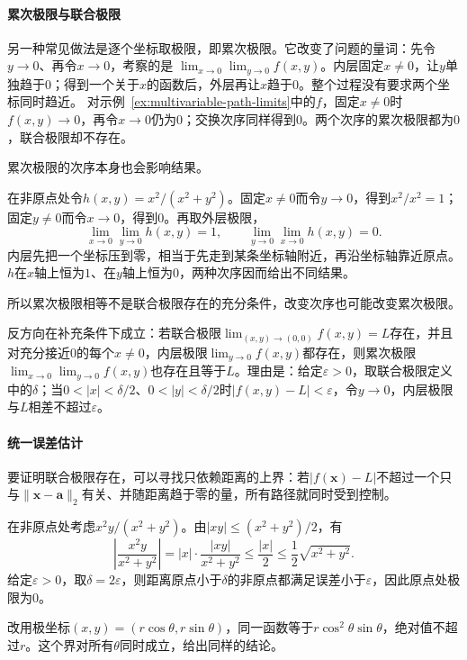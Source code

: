 \paragraph{累次极限与联合极限}
另一种常见做法是逐个坐标取极限，即累次极限。它改变了问题的量词：先令$y\to0$、再令$x\to0$，考察的是
$\lim_{x\to0}\lim_{y\to0}f(x,y)$。内层固定$x\neq0$，让$y$单独趋于$0$；得到一个关于$x$的函数后，外层再让$x$趋于$0$。整个过程没有要求两个坐标同时趋近。
对示例~\ref{ex:multivariable-path-limits}中的$f$，固定$x\neq0$时$f(x,y)\to0$，再令$x\to0$仍为$0$；交换次序同样得到$0$。两个次序的累次极限都为$0$，联合极限却不存在。

累次极限的次序本身也会影响结果。
\begin{example}[两个次序的累次极限不相等]
\label{ex:multivariable-iterated-limits-differ}
在非原点处令$h(x,y)=x^2/(x^2+y^2)$。固定$x\neq0$而令$y\to0$，得到$x^2/x^2=1$；固定$y\neq0$而令$x\to0$，得到$0$。再取外层极限，
\[
 \lim_{x\to0}\lim_{y\to0}h(x,y)=1,
 \qquad
 \lim_{y\to0}\lim_{x\to0}h(x,y)=0.
\]
内层先把一个坐标压到零，相当于先走到某条坐标轴附近，再沿坐标轴靠近原点。$h$在$x$轴上恒为$1$、在$y$轴上恒为$0$，两种次序因而给出不同结果。
\end{example}

所以累次极限相等不是联合极限存在的充分条件，改变次序也可能改变累次极限。

反方向在补充条件下成立：若联合极限$\lim_{(x,y)\to(0,0)}f(x,y)=L$存在，并且对充分接近$0$的每个$x\neq0$，内层极限$\lim_{y\to0}f(x,y)$都存在，则累次极限$\lim_{x\to0}\lim_{y\to0}f(x,y)$也存在且等于$L$。理由是：给定$\varepsilon>0$，取联合极限定义中的$\delta$；当$0<|x|<\delta/2$、$0<|y|<\delta/2$时$|f(x,y)-L|<\varepsilon$，令$y\to0$，内层极限与$L$相差不超过$\varepsilon$。

\paragraph{统一误差估计}
要证明联合极限存在，可以寻找只依赖距离的上界：若$|f(\bm x)-L|$不超过一个只与$\lVert\bm x-\bm a\rVert_2$有关、并随距离趋于零的量，所有路径就同时受到控制。
\begin{example}[用距离上界证明联合极限]
\label{ex:multivariable-distance-bound-limit}
在非原点处考虑$x^2y/(x^2+y^2)$。由$|xy|\leq(x^2+y^2)/2$，有
\[
 \left|\frac{x^2y}{x^2+y^2}\right|
 =|x|\cdot\frac{|xy|}{x^2+y^2}
 \leq \frac{|x|}{2}
 \leq\frac12\sqrt{x^2+y^2}.
\]
给定$\varepsilon>0$，取$\delta=2\varepsilon$，则距离原点小于$\delta$的非原点都满足误差小于$\varepsilon$，因此原点处极限为$0$。

改用极坐标$(x,y)=(r\cos\theta,r\sin\theta)$，同一函数等于$r\cos^2\theta\sin\theta$，绝对值不超过$r$。这个界对所有$\theta$同时成立，给出同样的结论。
\end{example}

